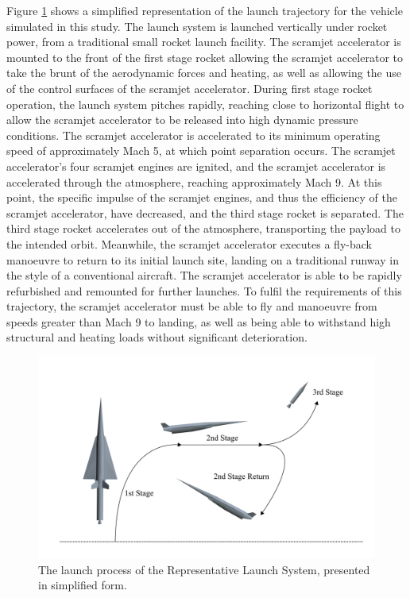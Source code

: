  Figure \ref{fig:Trajsimple} shows a simplified representation of the launch trajectory for the vehicle simulated in this study.
 The launch system is launched vertically under rocket power, from a traditional small rocket launch facility. The scramjet accelerator is mounted to the front of the first stage rocket allowing the scramjet accelerator to take the brunt of the aerodynamic forces and heating, as well as allowing the use of the control surfaces of the scramjet accelerator. During first stage rocket operation, the launch system pitches rapidly, reaching close to horizontal flight to allow the scramjet accelerator to be released into high dynamic pressure conditions. The scramjet accelerator is accelerated to its minimum operating speed of approximately Mach 5, at which point separation occurs. The scramjet accelerator's four scramjet engines are ignited, and the scramjet accelerator is accelerated through the atmosphere, reaching approximately Mach 9. At this point, the specific impulse of the scramjet engines, and thus the efficiency of the scramjet accelerator, have decreased, and the third stage rocket is separated. The third stage rocket accelerates out of the atmosphere, transporting the payload to the intended orbit. Meanwhile, the scramjet accelerator executes a fly-back manoeuvre to return to its initial launch site, landing on a traditional runway in the style of a conventional aircraft. The scramjet accelerator is able to be rapidly refurbished and remounted for further launches. To fulfil the requirements of this trajectory, the scramjet accelerator must be able to fly and manoeuvre from speeds greater than Mach 9 to landing, as well as being able to withstand high structural and heating loads without significant deterioration.
 \begin{figure}[ht]
 	\centering
 	\includegraphics[width=0.9\linewidth]{figures/3_vehicle_design/Trajsimple}
 	\caption{The launch process of the Representative Launch System, presented in simplified form.}
 	\label{fig:Trajsimple}
 \end{figure}

